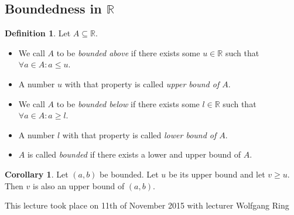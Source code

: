 \documentclass[a4paper,landscape,twocolumn]{article}
\theoremstyle{definition}
\newtheorem{defi}{Definition}
\newtheorem{cor}{Corollary}
\newcommand\meta[3]{\begin{mdframed}[skipbelow=4pt,skipabove=4pt,innermargin=1pt,innerleftmargin=1pt,innerrightmargin=1pt]\begin{center}\small{\textdownarrow{} This #1 took place on #2 with lecturer #3}\end{center}\end{mdframed}}
\begin{document}
\subsection{Boundedness in $\mathbb R$}
\begin{defi}
  Let $A \subseteq \mathbb R$.
  \begin{itemize}
    \item We call $A$ to be \emph{bounded above} if there exists some $u \in \mathbb R$ such that $\forall a \in A: a \leq u$.
    \item A number $u$ with that property is called \emph{upper bound of $A$}.
    \item We call $A$ to be \emph{bounded below} if there exists some $l \in \mathbb R$ such that $\forall a \in A: a \geq l$.
    \item A number $l$ with that property is called \emph{lower bound of $A$}.
    \item $A$ is called \emph{bounded} if there exists a lower and upper bound of $A$.
  \end{itemize}
\end{defi}

\begin{cor}
  Let $(a, b)$ be bounded.
  Let $u$ be its upper bound and let $v \geq u$.
  Then $v$ is also an upper bound of $(a, b)$.
\end{cor}

\meta{lecture}{11th of November 2015}{Wolfgang Ring}
\end{document}
